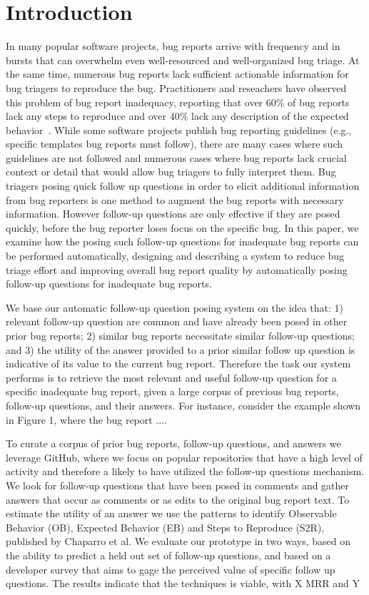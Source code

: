 \section{Introduction}

In many popular software projects, bug reports arrive with frequency and in bursts that can overwhelm even well-resourced and well-organized bug triage.
%
At the same time, numerous bug reports lack sufficient actionable information for bug triagers to reproduce the bug.
%
Practitioners and reseachers have observed this problem of bug report inadequacy, reporting that over 60\% of bug reports lack any steps to reproduce and over 40\% lack any description of the expected behavior~\cite{chaparro17detecting}.
%
While some software projects publish bug reporting guidelines (e.g., specific templates bug reports must follow), there are many cases where such guidelines are not followed and numerous cases where bug reports lack crucial context or detail that would allow bug triagers to fully interpret them.
%
Bug triagers posing quick follow up questions in order to elicit additional information from bug reporters is one method to augment the bug reports with necessary information.
%
However follow-up questions are only effective if they are posed quickly, before the bug reporter loses focus on the specific bug.
%
In this paper, we examine how the posing such follow-up questions for inadequate bug reports can be performed automatically, designing and describing a system to reduce bug triage effort and improving overall bug report quality by automatically posing follow-up questions for inadequate bug reports.

%
We base our automatic follow-up question posing system on the idea that: 1) relevant follow-up question are common and have already been posed in other prior bug reports; 2) similar bug reports necessitate similar follow-up questions; and 3) the utility of the answer provided to a prior similar follow up question is indicative of its value to the current bug report.
%
Therefore the task our system performs is to retrieve the most relevant and useful follow-up question for a specific inadequate bug report, given a large corpus of previous bug reports, follow-up questions, and their answers.
%
For instance, consider the example shown in Figure 1, where the bug report ....

To curate a corpus of prior bug reports, follow-up questions, and answers we leverage GitHub, where we focus on popular repositories that have a high level of activity and therefore a likely to have utilized the follow-up questions mechanism. We look for follow-up questions that have been posed in comments and gather answers that occur as comments or as edits to the original bug report text. To estimate the utility of an answer we use the patterns to identify Observable Behavior (OB), Expected Behavior (EB) and Steps to Reproduce (S2R), published by Chaparro et al. We evaluate our prototype in two ways, based on the ability to predict a held out set of follow-up questions, and based on a developer survey that aims to gage the perceived value of specific follow up questions. The results indicate that the techniques is viable, with X MRR and Y%

